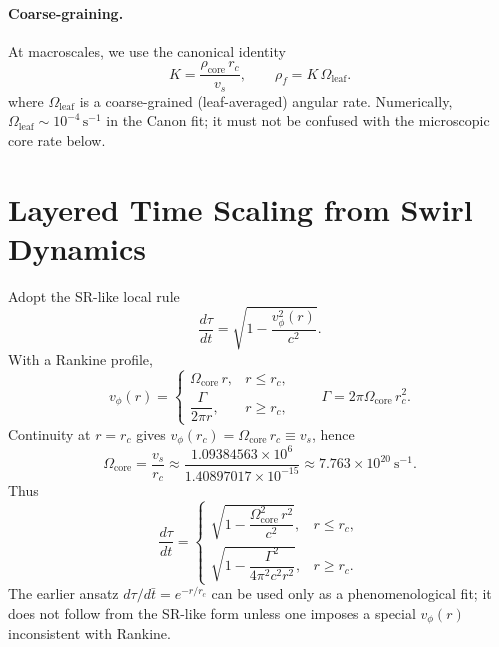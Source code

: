 \documentclass[11pt]{article}
\newcommand{\vscore}{v_s}                                %
\newcommand{\rhoF}{\rho_{\!f}}                           %
\newcommand{\rhoC}{\rho_{\mathrm{core}}} %
\begin{document}
		\paragraph{Coarse-graining.}
		At macroscales, we use the canonical identity
		\[
			K=\frac{\rhoC\,r_c}{\vscore},\qquad \rhoF=K\,\Omega_{\text{leaf}}.
		\]
		where $\Omega_{\text{leaf}}$ is a coarse-grained (leaf-averaged) angular rate. Numerically, $\Omega_{\text{leaf}}\sim 10^{-4}\,\mathrm{s^{-1}}$ in the Canon fit; it must not be confused with the microscopic core rate below.

	\section{Layered Time Scaling from Swirl Dynamics}
		Adopt the SR-like local rule
		\[
			\frac{d\tau}{dt}=\sqrt{1-\frac{v_\phi^{2}(r)}{c^{2}}}.
		\]
		With a Rankine profile,
		\[
			v_\phi(r)=
			\begin{cases}
				\Omega_{\text{core}}\,r, & r\le r_c,\\[4pt]
				\dfrac{\Gamma}{2\pi r}, & r\ge r_c,
			\end{cases}
			\qquad \Gamma=2\pi\Omega_{\text{core}}\,r_c^{2}.
		\]
		Continuity at $r=r_c$ gives $v_\phi(r_c)=\Omega_{\text{core}}\,r_c\equiv \vscore$, hence
		\[
			\Omega_{\text{core}}=\frac{\vscore}{r_c}\approx \frac{1.09384563\times 10^{6}}{1.40897017\times 10^{-15}}
			\approx 7.763\times 10^{20}\ \mathrm{s^{-1}}.
		\]
		Thus
		\[
			\frac{d\tau}{dt}=
			\begin{cases}
				\sqrt{1-\dfrac{\Omega_{\text{core}}^{2}\,r^{2}}{c^{2}}}, & r\le r_c,\\[6pt]
				\sqrt{1-\dfrac{\Gamma^{2}}{4\pi^{2}c^{2}r^{2}}}, & r\ge r_c.
			\end{cases}
		\]
		The earlier ansatz $d\tau/d\bar t=e^{-r/r_c}$ can be used only as a phenomenological fit; it does not follow from the SR-like form unless one imposes a special $v_\phi(r)$ inconsistent with Rankine.

	\ifdefined\standalonechapter\else
%	
%	
\end{document}

